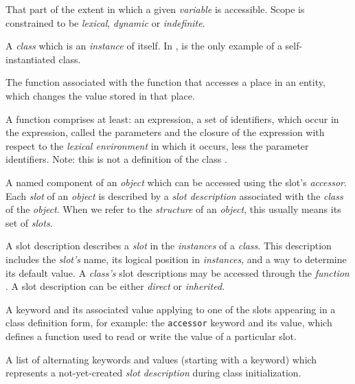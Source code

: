 \begin{optDefinition}
\begin{definitions}
     That part of the extent in which a
    given {\em variable} is accessible.  Scope is constrained to be {\em
        lexical}, {\em dynamic} or {\em indefinite}.

       A {\em class} which is
    an {\em instance} of itself.  In \eulisp,  is the only
    example of a self-instantiated class.

     The function
    associated with the function that accesses a place in an entity, which
    changes the value stored in that place.

     A function
    comprises at least: an expression, a set of identifiers, which occur in the
    expression, called the parameters and the closure of the expression with
    respect to the {\em lexical environment} in which it occurs, less the
    parameter identifiers.  Note: this is not a definition of the class
    .

      A named component of an {\em object}
    which can be accessed using the slot's {\em accessor}.  Each {\em slot} of
    an {\em object} is described by a {\em slot description} associated with the
    {\em class} of the {\em object}.  When we refer to the {\em structure} of an
    {\em object}, this usually means its set of {\em slots}.

      A slot
    description describes a {\em slot} in the {\em instances} of a {\em class}.
    This description includes the {\em slot's} name, its logical position in
    {\em instances}, and a way to determine its default value.  A {\em class's}
    slot descriptions may be accessed through the {\em function}
    .  A slot description can be either
    {\em direct} or {\em inherited}.

      A keyword and its
    associated value applying to one of the slots appearing in a class
    definition form, for example: the {\tt accessor} keyword and its
    value, which defines a function used to read or write the value of a
    particular slot.

      A list
    of alternating keywords and values (starting with a keyword) which
    represents a not-yet-created {\em slot} {\em description} during class
    initialization.


\end{definitions}
\end{optDefinition}
